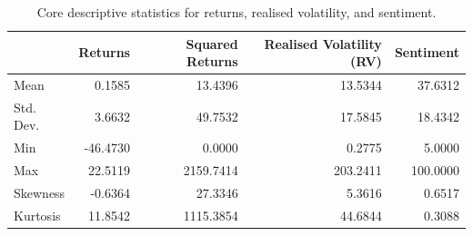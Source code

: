 \begin{table}[htbp]
\centering
\begin{tabular}{lrrrr}
\toprule
 & Returns & Squared Returns & Realised Volatility (RV) & Sentiment \\
\midrule
Mean & 0.1585 & 13.4396 & 13.5344 & 37.6312 \\
Std. Dev. & 3.6632 & 49.7532 & 17.5845 & 18.4342 \\
Min & -46.4730 & 0.0000 & 0.2775 & 5.0000 \\
Max & 22.5119 & 2159.7414 & 203.2411 & 100.0000 \\
Skewness & -0.6364 & 27.3346 & 5.3616 & 0.6517 \\
Kurtosis & 11.8542 & 1115.3854 & 44.6844 & 0.3088 \\
\bottomrule
\end{tabular}
\caption{Core descriptive statistics for returns, realised volatility, and sentiment.}
\label{tab:descriptive_stats}
\end{table}

